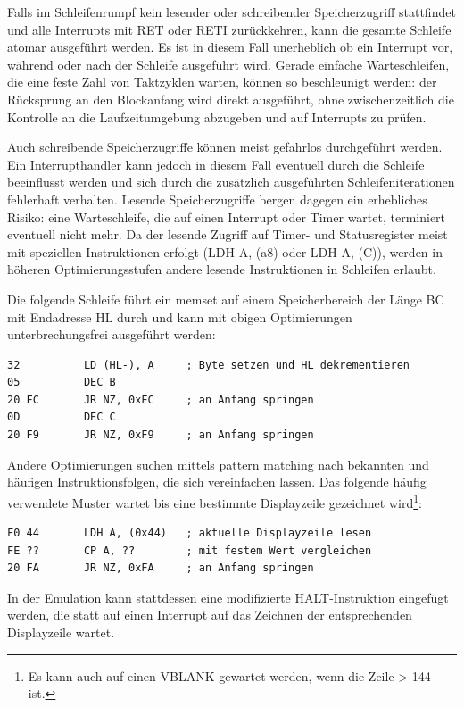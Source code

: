 \documentclass[a4paper]{scrartcl}
\begin{document}
Falls im Schleifenrumpf kein lesender oder schreibender Speicherzugriff stattfindet und alle Interrupts mit RET oder RETI zurückkehren, kann die gesamte Schleife atomar ausgeführt werden. Es ist in diesem Fall unerheblich ob ein Interrupt vor, während oder nach der Schleife ausgeführt wird. Gerade einfache Warteschleifen, die eine feste Zahl von Taktzyklen warten, können so beschleunigt werden: der Rücksprung an den Blockanfang wird direkt ausgeführt, ohne zwischenzeitlich die Kontrolle an die Laufzeitumgebung abzugeben und auf Interrupts zu prüfen.

Auch schreibende Speicherzugriffe können meist gefahrlos durchgeführt werden. Ein Interrupthandler kann jedoch in diesem Fall eventuell durch die Schleife beeinflusst werden und sich durch die zusätzlich ausgeführten Schleifeniterationen fehlerhaft verhalten. Lesende Speicherzugriffe bergen dagegen ein erhebliches Risiko: eine Warteschleife, die auf einen Interrupt oder Timer wartet, terminiert eventuell nicht mehr. Da der lesende Zugriff auf Timer- und Statusregister meist mit speziellen Instruktionen erfolgt (LDH A, (a8) oder LDH A, (C)), werden in höheren Optimierungsstufen andere lesende Instruktionen in Schleifen erlaubt.

Die folgende Schleife führt ein memset auf einem Speicherbereich der Länge BC mit Endadresse HL durch und kann mit obigen Optimierungen unterbrechungsfrei ausgeführt werden:

\begin{lstlisting}
32			LD (HL-), A		; Byte setzen und HL dekrementieren
05			DEC B
20 FC		JR NZ, 0xFC		; an Anfang springen
0D			DEC C
20 F9		JR NZ, 0xF9		; an Anfang springen
\end{lstlisting}

Andere Optimierungen suchen mittels pattern matching nach bekannten und häufigen Instruktionsfolgen, die sich vereinfachen lassen. Das folgende häufig verwendete Muster wartet bis eine bestimmte Displayzeile gezeichnet wird\footnote{Es kann auch auf einen VBLANK gewartet werden, wenn die Zeile > 144 ist.}:

\begin{lstlisting}
F0 44		LDH A, (0x44)	; aktuelle Displayzeile lesen
FE ??		CP A, ??		; mit festem Wert vergleichen
20 FA		JR NZ, 0xFA		; an Anfang springen
\end{lstlisting}

In der Emulation kann stattdessen eine modifizierte HALT-Instruktion eingefügt werden, die statt auf einen Interrupt auf das Zeichnen der entsprechenden Displayzeile wartet.
\end{document}
